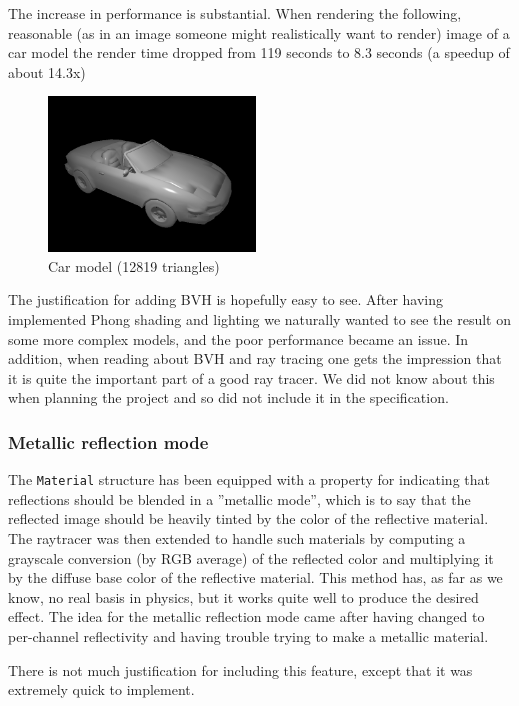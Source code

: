 \documentclass[a4paper,11pt]{article}
\begin{document}
The increase in performance is substantial. When rendering the following, reasonable
(as in an image someone might realistically want to render) image of a car model the render
time dropped from 119 seconds to 8.3 seconds (a speedup of about 14.3x)

\begin{figure}[H]
\begin{center}
\includegraphics[width=5.5cm]{car.png}
\caption{Car model (12819 triangles)}
\end{center}
\end{figure}
\vspace{-0.5cm}

The justification for adding BVH is hopefully easy to see. After having implemented Phong
shading and lighting we naturally wanted to see the result on some more complex models,
and the poor performance became an issue. In addition, when reading about BVH and ray
tracing one gets the impression that it is quite the important part of a good
ray tracer. We did not know about this when planning the project and so did not include
it in the specification.

\subsubsection{Metallic reflection mode}
The \texttt{Material} structure has been equipped with a property for indicating that reflections
should be blended in a ''metallic mode'', which is to say that the reflected image should
be heavily tinted by the color of the reflective material. The raytracer was then extended
to handle such materials by computing a grayscale conversion (by RGB average) of the reflected
color and multiplying it by the diffuse base color of the reflective material. This method
has, as far as we know, no real basis in physics, but it works quite well to produce the desired
effect. The idea for the metallic reflection mode came after having changed to per-channel
reflectivity and having trouble trying to make a metallic material.

There is not much justification for including this feature, except that it was extremely
quick to implement.
\end{document}
